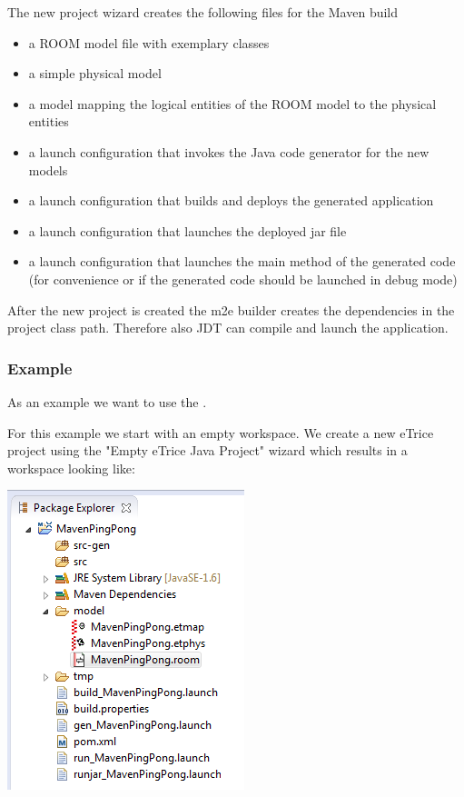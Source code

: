 The \eTrice{} new project wizard creates the following files for the Maven build
\begin{itemize}
\item a ROOM model file with exemplary classes
\item a simple physical model
\item a model mapping the logical entities of the ROOM model to the physical entities
\item a launch configuration that invokes the \eTrice{} Java code generator for the new models
\item a launch configuration that builds and deploys the generated application
\item a launch configuration that launches the deployed jar file
\item a launch configuration that launches the main method of the generated code (for convenience or
if the generated code should be launched in debug mode)
\end{itemize}

After the new project is created the m2e builder creates the dependencies in the project class path.
Therefore also JDT can compile and launch the application.

\subsubsection*{Example}

As an example we want to use the .

For this example we start with an empty workspace.
We create a new eTrice project using the "Empty eTrice Java Project" wizard which results in a workspace looking
like:

\includegraphics{images/042-after-project-creation.png}

